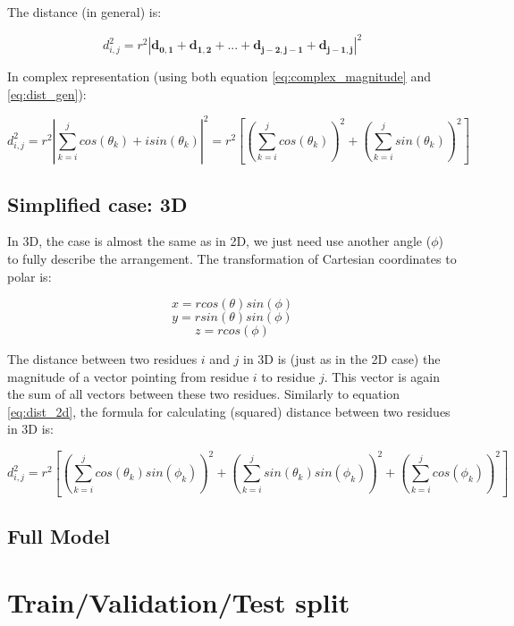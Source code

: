 The distance (in general) is:
        
\begin{equation}
    d_{i,j}^2 = r^2 |\bm{d_{0,1}} + \bm{d_{1,2}} + ... + \bm{d_{j-2,j-1}} + \bm{d_{j-1,j}}|^2
    \label{eq:dist_gen}
\end{equation}
        
In complex representation (using both equation \ref{eq:complex_magnitude} and \ref{eq:dist_gen}):
        
\begin{equation}
    d_{i,j}^2 = r^2 \left|\sum_{k=i}^j cos(\theta_k) + i sin(\theta_k)\right|^2 = r^2 \left[\left(\sum_{k=i}^j cos(\theta_k)\right)^2 + \left(\sum_{k=i}^j sin(\theta_k)\right)^2\right]
    \label{eq:dist_2d}
\end{equation}
        
\subsection{Simplified case: 3D}
        
In 3D, the case is almost the same as in 2D, we just need use another angle ($\phi$) to fully describe the arrangement. 
The transformation of Cartesian coordinates to polar is:
        
$$x = r cos(\theta) sin(\phi)$$
$$y = r sin(\theta) sin(\phi)$$
$$z = r cos(\phi)$$
   
The distance between two residues $i$ and $j$ in 3D is (just as in the 2D case) the magnitude of a vector pointing from residue $i$ to residue $j$. 
This vector is again the sum of all vectors between these two residues. 
Similarly to equation \ref{eq:dist_2d}, the formula for calculating (squared) distance between two residues in 3D is:
        
\begin{equation}
    d_{i,j}^2 = r^2 \left[\left(\sum_{k=i}^j cos(\theta_k) sin(\phi_k)\right)^2 + \left(\sum_{k=i}^j sin(\theta_k) sin(\phi_k)\right)^2 + \left(\sum_{k=i}^j cos(\phi_k)\right)^2\right]
\end{equation}
        
\subsection{Full Model}

\section{Train/Validation/Test split}
    
